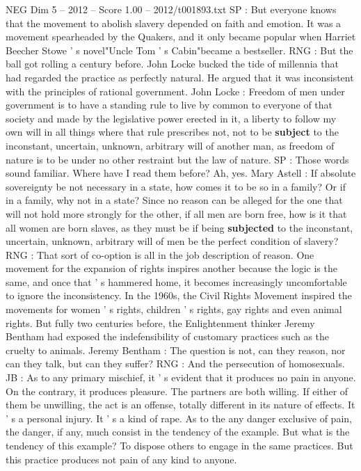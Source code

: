 \begin{textsample}{NEG Dim 5 – 2012 – Score 1.00 – 2012/t001893.txt}
SP : But everyone knows that the movement to abolish slavery depended on faith and emotion.
It was a movement spearheaded by the Quakers, and it only became popular when Harriet Beecher Stowe ' s novel"Uncle Tom ' s Cabin"became a bestseller.
RNG : But the ball got rolling a century before.
John Locke bucked the tide of millennia that had regarded the practice as perfectly natural.
He argued that it was inconsistent with the principles of rational government.
John Locke : Freedom of men under government is to have a standing rule to live by common to everyone of that society and made by the legislative power erected in it, a liberty to follow my own will in all things where that rule prescribes not, not to be \textbf{subject} to the inconstant, uncertain, unknown, arbitrary will of another man, as freedom of nature is to be under no other restraint but the law of nature.
SP : Those words sound familiar.
Where have I read them before?
Ah, yes.
Mary Astell : If absolute sovereignty be not necessary in a state, how comes it to be so in a family?
Or if in a family, why not in a state?
Since no reason can be alleged for the one that will not hold more strongly for the other, if all men are born free, how is it that all women are born slaves, as they must be if being \textbf{subjected} to the inconstant, uncertain, unknown, arbitrary will of men be the perfect condition of slavery?
RNG : That sort of co-option is all in the job description of reason.
One movement for the expansion of rights inspires another because the logic is the same, and once that ' s hammered home, it becomes increasingly uncomfortable to ignore the inconsistency.
In the 1960s, the Civil Rights Movement inspired the movements for women ' s rights, children ' s rights, gay rights and even animal rights.
But fully two centuries before, the Enlightenment thinker Jeremy Bentham had exposed the indefensibility of customary practices such as the cruelty to animals.
Jeremy Bentham : The question is not, can they reason, nor can they talk, but can they suffer?
RNG : And the persecution of homosexuals.
JB : As to any primary mischief, it ' s evident that it produces no pain in anyone.
On the contrary, it produces pleasure.
The partners are both willing.
If either of them be unwilling, the act is an offense, totally different in its nature of effects.
It ' s a personal injury.
It ' s a kind of rape.
As to the any danger exclusive of pain, the danger, if any, much consist in the tendency of the example.
But what is the tendency of this example?
To dispose others to engage in the same practices.
But this practice produces not pain of any kind to anyone.

\end{textsample}
